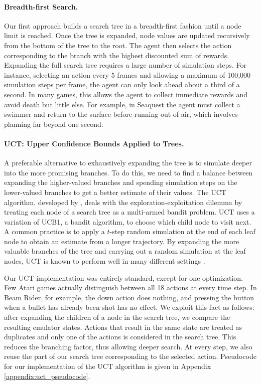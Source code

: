 \documentclass[twoside,11pt]{article}
\newcommand{\gamename}[1]{{\sc #1}}
\begin{document}
\paragraph{Breadth-first Search.}
\label{sec:agents:search:fulltree}
Our first approach builds a search tree in a breadth-first fashion until a node limit is reached.
Once the tree is expanded, node values are updated recursively from the bottom of the tree to the root. The agent then selects the action corresponding to the branch with the highest discounted sum of rewards. Expanding the full search tree requires a large number of simulation steps. 
For instance, selecting an action every 5 frames and allowing a maximum of 100,000 simulation steps per frame, the agent can only look ahead about a third of a second. 
In many games, this allows the agent to collect immediate rewards and avoid death but little else. For example, in \gamename{Seaquest} the agent must collect a swimmer and return to the surface before running out of air, which involves planning far beyond one second.

\paragraph{UCT: Upper Confidence Bounds Applied to Trees.}
\label{sec:agents:search:uct}
A preferable alternative to exhaustively expanding the tree is to simulate deeper into the more promising branches. To do this, we need to find a balance between expanding the higher-valued branches and spending simulation steps on the lower-valued branches to get a better estimate of their values. 
The UCT algorithm, developed by , deals with the exploration-exploitation dilemma by treating each node of a search tree as a multi-armed bandit problem. UCT uses a variation of UCB1, a bandit algorithm, to choose which child node to visit next. A common practice is to apply a $t$-step random simulation at the end of each leaf node to obtain an estimate from a longer trajectory. By expanding the more valuable branches of the tree and carrying out a random simulation at the leaf nodes, UCT is known to perform well in many different settings .
 
Our UCT implementation was entirely standard, except for one optimization.
Few Atari games actually distinguish between all 18 actions at every time step. 
In \gamename{Beam Rider}, for example, the down action does nothing, and pressing the button when a bullet has already been shot has no effect. We exploit this fact as follows: after expanding the children of a node in the search tree, we compare the resulting emulator states. Actions that result in the same state are treated as duplicates and only one of the actions is considered in the search tree. This reduces the branching factor, thus allowing deeper search. At every step, we also reuse the part of our search tree corresponding to the selected action. Pseudocode for our implementation of the UCT algorithm is given in Appendix \ref{appendix:uct_pseudocode}.
\end{document}
